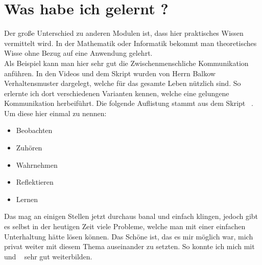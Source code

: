 \chapter{Was habe ich gelernt ? }

Der große Unterschied zu anderen Modulen ist, dass hier praktisches Wissen vermittelt wird. In der Mathematik oder Informatik  bekommt man theoretisches Wisse ohne Bezug auf eine Anwendung gelehrt. \\


 Als Beispiel kann man hier sehr gut die Zwischenmenschliche Kommunikation anführen. In den Videos und dem Skript wurden von Herrn Balkow Verhaltensmuster dargelegt, welche für das gesamte Leben nützlich sind. So erlernte ich dort verschiedenen Varianten kennen, welche eine  gelungene Kommunikation herbeiführt. Die folgende Auflistung stammt aus dem Skript ~\cite{Skript}. Um diese hier einmal zu nennen:
\begin{itemize}
	\item Beobachten
	\item Zuhören
	\item Wahrnehmen
	\item Reflektieren
	\item Lernen
\end{itemize} 

 
Das mag an einigen Stellen jetzt durchaus banal und einfach klingen, jedoch gibt es selbst in der heutigen Zeit viele Probleme, welche man mit einer einfachen Unterhaltung hätte lösen können. Das Schöne ist, das es mir möglich war, mich privat weiter mit diesem Thema auseinander zu setzten. So konnte ich mich mit ~\cite{Schlüssel} und ~\cite{fRede} sehr gut weiterbilden.

